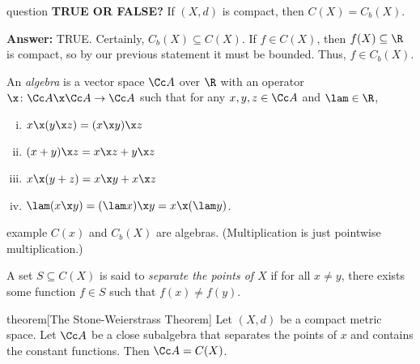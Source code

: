 \documentclass[class=article, crop=false]{standalone}
\begin{document}
\begin{understandingcheck}{question}
  \textbf{TRUE OR FALSE?} If $(X,d)$ is compact, then $C(X) = C_b(X)$.

  \textbf{Answer:} TRUE. Certainly, $C_b(X) \subseteq C(X)$. If $f \in C(X)$, then $f(X) \subseteq \R$ is compact, so by our previous statement it must be bounded. Thus, $f \in C_b(X)$.
\end{understandingcheck}


\begin{defn}
  An \emph{algebra} is a vector space $\Cc A$ over $\R$ with an operator $\x \colon \Cc A \x \Cc A \to \Cc A$ such that for any $x,y,z \in \Cc A$ and $\lam \in \R$,
    \begin{enumerate}[(i)]
      \item $x \x (y \x z) = (x \x y) \x z$
      \item $(x+y)\x z = x \x z + y \x z$
      \item $x \x (y+z) = x \x y + x \x z$
      \item $\lam (x \x y) = (\lam x) \x y = x \x (\lam y)$.
    \end{enumerate}
\end{defn}

\begin{understandingcheck}{example}
  $C(x)$ and $C_b(X)$ are algebras. (Multiplication is just pointwise multiplication.)
\end{understandingcheck}

\begin{defn}
  A set $S \subseteq C(X)$ is said to \emph{separate the points of $X$} if for all $x \neq y$, there exists some function $f \in S$ such that $f(x)\neq f(y)$.
\end{defn}

\begin{result}{theorem}[The Stone-Weierstrass Theorem]
  Let $(X,d)$ be a compact metric space. Let $\Cc A$ be a close subalgebra that separates the points of $x$ and contains the constant functions. Then $\Cc A = C(X)$.
\end{result}
\end{document}
